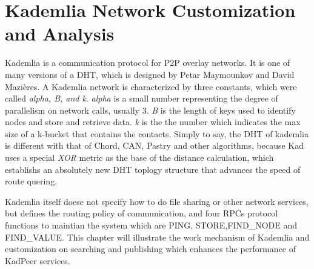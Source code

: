 \chapter{Kademlia Network Customization and Analysis}
\label{cha:cha2}
{
Kademlia is a communication protocol for P2P overlay networks. 
It is one of many versions of a DHT, which is designed by Petar Maymounkov and David Mazières.
A Kademlia network is characterized by three constants, which were called \emph{alpha, B, and k}.
\emph{alpha} is a small number representing the degree of parallelism on network calls, usually 3.
\emph{B} is the length of keys used to identify nodes and store and retrieve data.
\emph{k} is the the number which indicates the max size of a k-bucket that contains the contacts.
Simply to say, the DHT of kademlia is different with that of Chord, CAN, Pastry and other algorithms, because Kad uses a special \emph{XOR} metric as the base of the distance calculation, which establishs an absolutely new DHT toplogy structure that advances the speed of route quering.

Kademlia itself doese not specify how to do file sharing or other network services, but defines the routing policy of communication, and four RPCs protocol functions to maintian the system which are PING, STORE,FIND\_NODE and FIND\_VALUE.
This chapter will illustrate the work mechanism of Kademlia and customization on searching and publishing which enhances the performance of KadPeer services.

}
